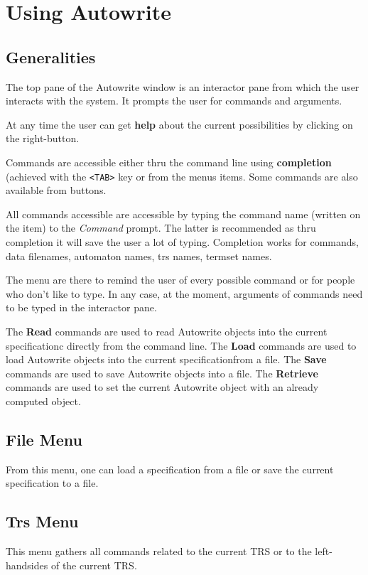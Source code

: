 \documentclass[11pt]{llncs}
\def\autocom#1{\textsl{#1 }}
\begin{document}
\section{Using Autowrite}

\subsection{Generalities}
The top pane of the Autowrite window is an interactor pane from which the user interacts with
the system. It prompts the user for commands and arguments.

At any time the user can get \textbf{help} about the current possibilities
by clicking on the right-button.

Commands are accessible either thru the command line using \textbf{completion} 
(achieved with the \verb+<TAB>+ key
or from the menus items. Some commands are also available from buttons.

All commands accessible are accessible by typing
the command name (written on the item) to the \autocom{Command} prompt.
The latter is recommended as thru completion it will save the user a lot
of typing. Completion works for commands, data filenames, automaton names,
trs names, termset names.

The menu are there to remind the user of every possible command or for people
who don't like to type. In any case, at the moment, arguments of commands
need to be typed in the interactor pane.

The \textbf{Read} commands are used to read Autowrite objects into the current specificationc directly
from the command line. 
The \textbf{Load} commands are used to load Autowrite objects into the current specificationfrom a file.
The \textbf{Save} commands are used to save Autowrite objects into a file.
The \textbf{Retrieve} commands are used to set the current Autowrite object
with an already computed object.

\subsection{File Menu}
From this menu, one can load a specification from a file or save the current
specification to a file.

\subsection{Trs Menu}
This menu gathers all commands related to the current TRS or to the left-handsides
of the current TRS.
\end{document}
